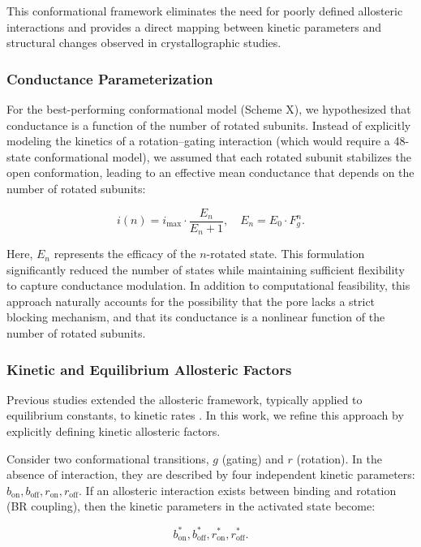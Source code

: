 \documentclass[pdflatex,sn-mathphys-num]{sn-jnl}%
\theoremstyle{thmstyleone}%
\theoremstyle{thmstyletwo}%
\theoremstyle{thmstylethree}%
\begin{document}
This conformational framework eliminates the need for poorly defined allosteric interactions and provides a direct mapping between kinetic parameters and structural changes observed in crystallographic studies.

\subsubsection{Conductance Parameterization}

For the best-performing conformational model (Scheme X), we hypothesized that conductance is a function of the number of rotated subunits. Instead of explicitly modeling the kinetics of a rotation–gating interaction (which would require a 48-state conformational model), we assumed that each rotated subunit stabilizes the open conformation, leading to an effective mean conductance that depends on the number of rotated subunits:

\[
i(n) = i_{\text{max}} \cdot \frac{E_n}{E_n + 1}, \quad E_n = E_0 \cdot F_g^n.
\]

Here, \( E_n \) represents the efficacy of the \( n \)-rotated state. This formulation significantly reduced the number of states while maintaining sufficient flexibility to capture conductance modulation. In addition to computational feasibility, this approach naturally accounts for the possibility that the pore lacks a strict blocking mechanism, and that its conductance is a nonlinear function of the number of rotated subunits.

\subsubsection{Kinetic and Equilibrium Allosteric Factors}

Previous studies extended the allosteric framework, typically applied to equilibrium constants, to kinetic rates \cite{Moffatt_hume}. In this work, we refine this approach by explicitly defining kinetic allosteric factors.

Consider two conformational transitions, \( g \) (gating) and \( r \) (rotation). In the absence of interaction, they are described by four independent kinetic parameters: \( b_{\text{on}}, b_{\text{off}}, r_{\text{on}}, r_{\text{off}} \). If an allosteric interaction exists between binding and rotation (BR coupling), then the kinetic parameters in the activated state become:

\[
b^*_{\text{on}}, b^*_{\text{off}}, r^*_{\text{on}}, r^*_{\text{off}}.
\]
\end{document}
